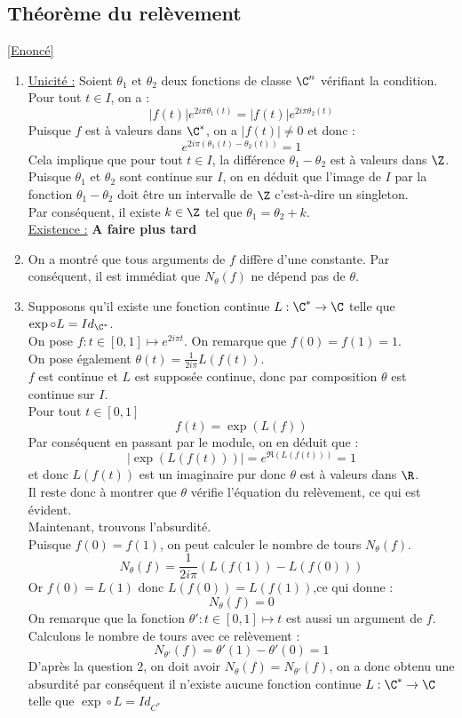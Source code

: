 \documentclass{book}
\begin{document}
	\subsection{Théorème du relèvement}
	\label{sec:theoreme-du-relevement}
	\textcolor{blue}{\hyperref[Théorème du relèvement]{[Enoncé]}}\\
	\begin{enumerate}
		\item \underline{Unicité :} Soient $\theta_1$ et $\theta_2$ deux fonctions de classe $\C^n$ vérifiant la condition. Pour tout $t\in I$, on a :
		\[|f(t)|e^{2i\pi\theta_1(t)}=|f(t)|e^{2i\pi\theta_2(t)}\]
		Puisque $f$ est à valeurs dans $\C^*$, on a $|f(t)|\ne0$ et donc :
		\[e^{2i\pi(\theta_1(t)-\theta_2(t))}=1\]
		Cela implique que pour tout $t\in I$, la différence $\theta_1-\theta_2$ est à valeurs dans $\Z$. Puisque $\theta_1$ et $\theta_2$ sont continue sur $I$, on en déduit que l'image de $I$ par la fonction $\theta_1-\theta_2$ doit être un intervalle de $\Z$ c'est-à-dire un singleton.\\
		Par conséquent, il existe $k\in\Z$ tel que $\theta_1=\theta_2+k$.\\
		\underline{Existence :} \textbf{A faire plus tard}
		\item On a montré que tous arguments de $f$ diffère d'une constante. Par conséquent, il est immédiat que $N_\theta(f)$ ne dépend pas de $\theta$.
		\item Supposons qu'il existe une fonction continue $L:\C^*\to\C$ telle que $\exp\circ L=Id_{\C^*}$.\\
		On pose $f:t\in[0,1]\mapsto e^{2i\pi t}$. On remarque que $f(0)=f(1)=1$.\\
		On pose également $\theta(t)=\frac{1}{2i\pi}L(f(t))$.\\
		$f$ est continue et $L$ est supposée continue, donc par composition $\theta$ est continue sur $I$.\\
		Pour tout $t\in[0,1]$
		\[f(t)=\exp(L(f))\]
		Par conséquent en passant par le module, on en déduit que :
		\[|\exp(L(f(t)))|=e^{\Re(L(f(t)))}=1\]
		et donc $L(f(t))$ est un imaginaire pur donc $\theta$ est à valeurs dans $\R$.\\
		Il reste donc à montrer que $\theta$ vérifie l'équation du relèvement, ce qui est évident.\\
		Maintenant, trouvons l'absurdité.\\
		Puisque $f(0)=f(1)$, on peut calculer le nombre de tours $N_\theta(f)$. 
		\[N_\theta(f)=\frac{1}{2i\pi}\left(L(f(1))-L(f(0))\right)\]
		Or $f(0)=L(1)$ donc $L(f(0))=L(f(1))$,ce qui donne :
		\[N_\theta(f)=0\]
		On remarque que la fonction $\theta':t\in[0,1]\mapsto t$ est aussi un argument de $f$.\\
		Calculons le nombre de tours avec ce relèvement :
		\[N_{\theta'}(f)=\theta'(1)-\theta'(0)=1\]
		D'après la question $2$, on doit avoir $N_\theta(f)=N_{\theta'}(f)$, on a donc obtenu une absurdité par conséquent il n'existe aucune fonction continue $L:\C^*\to\C$ telle que $\exp\circ L=Id_{C^*}$
	\end{enumerate}
\end{document}
